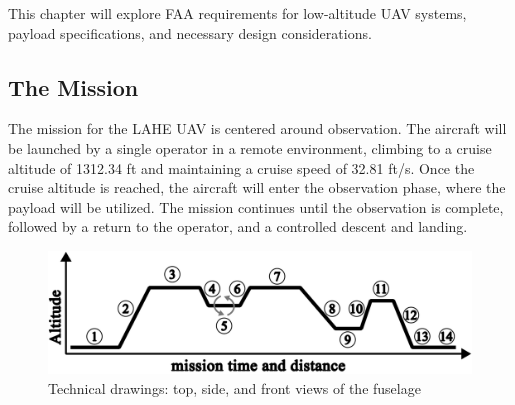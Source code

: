 \documentclass[12pt]{article}
\begin{document}
	This chapter will explore FAA requirements for low-altitude UAV systems, payload specifications, and necessary design considerations.
	
	\subsection{The Mission}
	The mission for the LAHE UAV is centered around observation. The aircraft will be launched by a single operator in a remote environment, climbing to a cruise altitude of 1312.34 ft and maintaining a cruise speed of 32.81 ft/s. Once the cruise altitude is reached, the aircraft will enter the observation phase, where the payload will be utilized. The mission continues until the observation is complete, followed by a return to the operator, and a controlled descent and landing.
	
	\begin{figure}[h!]
		\centering
		\includegraphics[width=4.5 in]{Media/MissonPlan.png} %
		\caption{Technical drawings: top, side, and front views of the fuselage}
	\end{figure}
	
\end{document}
